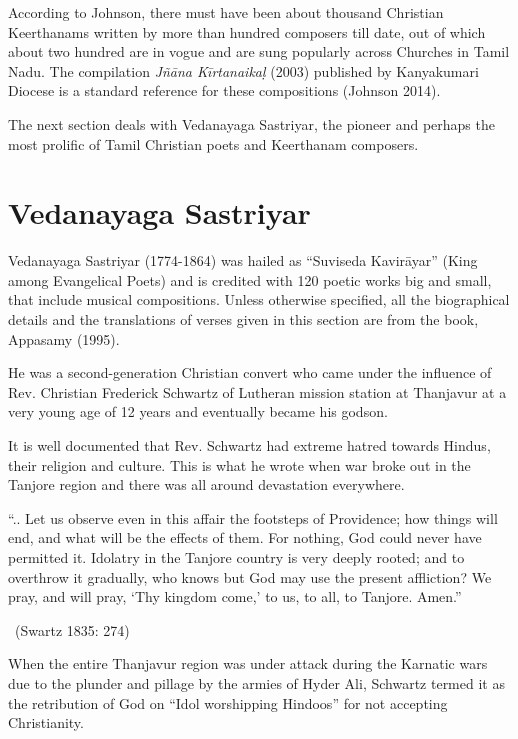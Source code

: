 According to Johnson, there must have been about thousand Christian Keerthanams written by more than hundred composers till date, out of which about two hundred are in vogue and are sung popularly across Churches in Tamil Nadu. The compilation \textit{Jñāna Kīrtanaikaḷ} (2003) published by Kanyakumari Diocese is a standard reference for these compositions (Johnson 2014).

The next section deals with Vedanayaga Sastriyar, the pioneer and perhaps the most prolific of Tamil Christian poets and Keerthanam composers.


\section*{Vedanayaga Sastriyar}

Vedanayaga Sastriyar (1774-1864) was hailed as “Suviseda Kavirāyar” (King among Evangelical Poets) and is credited with 120 poetic works big and small, that include musical compositions. Unless otherwise specified, all the biographical details and the translations of verses given in this section are from the book, Appasamy (1995).

He was a second-generation Christian convert who came under the influence of Rev. Christian Frederick Schwartz of Lutheran mission station at Thanjavur at a very young age of 12 years and eventually became his godson.

It is well documented that Rev. Schwartz had extreme hatred towards Hindus, their religion and culture. This is what he wrote when war broke out in the Tanjore region and there was all around devastation everywhere.

\begin{myquote}
“.. Let us observe even in this affair the footsteps of Providence; how things will end, and what will be the effects of them. For nothing, God could never have permitted it. Idolatry in the Tanjore country is very deeply rooted; and to overthrow it gradually, who knows but God may use the present affliction? We pray, and will pray, ‘Thy kingdom come,’ to us, to all, to Tanjore. Amen.” 

~\hfill (Swartz 1835: 274)
\end{myquote}

When the entire Thanjavur region was under attack during the Karnatic wars due to the plunder and pillage by the armies of Hyder Ali, Schwartz termed it as the retribution of God on “Idol worshipping Hindoos” for not accepting Christianity.

